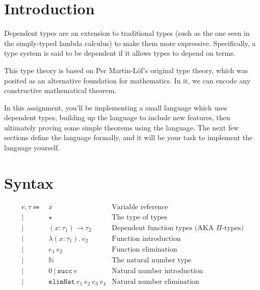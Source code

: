 \documentclass[12pt]{article}
\date{}
\title{}
\begin{document}
\section*{Introduction}
\label{sec:orgaad82bf}

Dependent types are an extension to traditional types (such as the one seen in the simply-typed lambda calculus) to make them more expressive. Specifically, a type system is said to be dependent if it allows types to depend on terms. 

This type theory is based on Per Martin-Löf's original type theory, which was posited as an alternative foundation for mathematics. In it, we can encode any constructive mathematical theorem.

In this assignment, you'll be implementing a small language which uses dependent types, building up the language to include new features, then ultimately proving some simple theorems using the language. The next few sections define the language formally, and it will be your task to implement the language yourself.

\section*{Syntax}
\label{sec:org8043dcc}

\begin{align*}
e, \tau \Coloneqq&\ x                           & \text{Variable reference} \\
  |&\ \star                               & \text{The type of types} \\
  |&\ (x : \tau_1) \rightarrow \tau_2           & \text{Dependent function types (AKA $\Pi$-types)}\\
  |&\ \lambda (x : \tau_1).\ e_2               & \text{Function introduction} \\
  |&\ e_1\ e_2                            & \text{Function elimination}\\
  |&\ \mathbb{N}                          & \text{The natural number type}\\
  |&\ 0\ |\ \mathtt{succ}\ e              & \text{Natural number introduction}\\
  |&\ \mathtt{elimNat}\ e_1\ e_2\ e_3\ e_4 & \text{Natural number elimination}
\end{align*}
\end{document}
